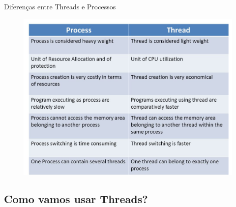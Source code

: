\documentclass[10pt, xcolor=x11names]{beamer}
\begin{document}

\begin{frame}
	\begin{block}{Diferenças entre Threads e Processos}
		\begin{figure}
		\centering
			\includegraphics[width=.8\linewidth]{img/diff-proc-thre.jpg}
		\end{figure}
	\end{block}
\end{frame}

\subsection{Como vamos usar Threads?} %
\end{document}
